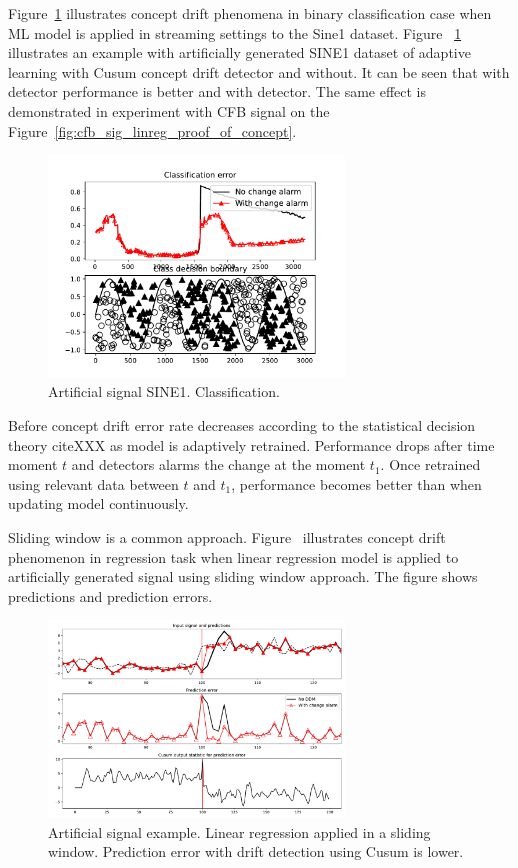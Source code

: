 Figure~\ref{fig:sine1_example} illustrates concept drift phenomena in binary classification case when ML model is applied in streaming settings to the Sine1 dataset. 
Figure ~\ref{fig:sine1_example} illustrates an example with artificially generated SINE1 dataset of adaptive learning with Cusum concept drift detector and without. 
It can be seen that with detector performance is better and with detector.
The same effect is demonstrated in experiment with CFB signal on the Figure~\ref{fig:cfb_sig_linreg_proof_of_concept}.
\begin{figure}[!htb]
  \centering
  \includegraphics[width=0.7\textwidth]{images/proof_of_concept_dt_sine1}
  \caption{Artificial signal SINE1. Classification.}\label{fig:sine1_example}
\end{figure}
Before concept drift error rate decreases according to the statistical decision theory cite{XXX} as model is adaptively retrained. 
Performance drops after time moment $t$ and detectors alarms the change at the moment $t_1$. 
Once retrained using relevant data between $t$ and $t_1$, performance becomes better than when updating model continuously.

Sliding window is a common approach.
Figure~\cite{fig:art_sig_example} illustrates concept drift phenomenon in regression task when linear regression model is applied to artificially generated signal using sliding window approach. 
The figure shows predictions and prediction errors.
\begin{figure}[!htb]
  \centering
  \includegraphics[width=0.7\textwidth]{images/proof_of_concept_linreg_art_sig}
  \caption{Artificial signal example. Linear regression applied in a sliding window. Prediction error with drift detection using Cusum is lower.}\label{fig:art_sig_example}
\end{figure}

